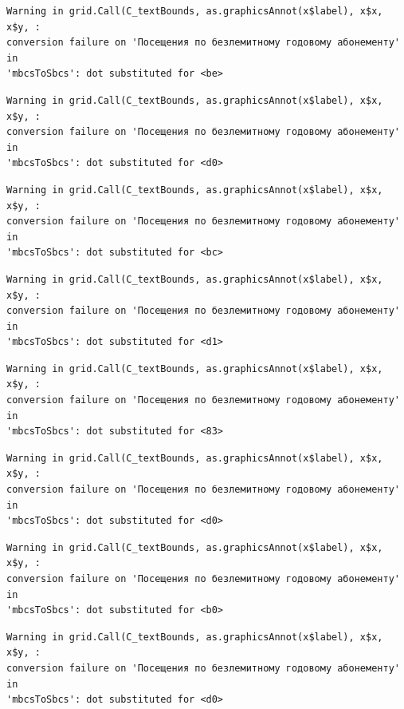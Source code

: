\documentclass[
  letterpaper,
  DIV=11,
  numbers=noendperiod]{scrartcl}
\begin{document}
\begin{verbatim}
Warning in grid.Call(C_textBounds, as.graphicsAnnot(x$label), x$x, x$y, :
conversion failure on 'Посещения по безлемитному годовому абонементу' in
'mbcsToSbcs': dot substituted for <be>
\end{verbatim}

\begin{verbatim}
Warning in grid.Call(C_textBounds, as.graphicsAnnot(x$label), x$x, x$y, :
conversion failure on 'Посещения по безлемитному годовому абонементу' in
'mbcsToSbcs': dot substituted for <d0>
\end{verbatim}

\begin{verbatim}
Warning in grid.Call(C_textBounds, as.graphicsAnnot(x$label), x$x, x$y, :
conversion failure on 'Посещения по безлемитному годовому абонементу' in
'mbcsToSbcs': dot substituted for <bc>
\end{verbatim}

\begin{verbatim}
Warning in grid.Call(C_textBounds, as.graphicsAnnot(x$label), x$x, x$y, :
conversion failure on 'Посещения по безлемитному годовому абонементу' in
'mbcsToSbcs': dot substituted for <d1>
\end{verbatim}

\begin{verbatim}
Warning in grid.Call(C_textBounds, as.graphicsAnnot(x$label), x$x, x$y, :
conversion failure on 'Посещения по безлемитному годовому абонементу' in
'mbcsToSbcs': dot substituted for <83>
\end{verbatim}

\begin{verbatim}
Warning in grid.Call(C_textBounds, as.graphicsAnnot(x$label), x$x, x$y, :
conversion failure on 'Посещения по безлемитному годовому абонементу' in
'mbcsToSbcs': dot substituted for <d0>
\end{verbatim}

\begin{verbatim}
Warning in grid.Call(C_textBounds, as.graphicsAnnot(x$label), x$x, x$y, :
conversion failure on 'Посещения по безлемитному годовому абонементу' in
'mbcsToSbcs': dot substituted for <b0>
\end{verbatim}

\begin{verbatim}
Warning in grid.Call(C_textBounds, as.graphicsAnnot(x$label), x$x, x$y, :
conversion failure on 'Посещения по безлемитному годовому абонементу' in
'mbcsToSbcs': dot substituted for <d0>
\end{verbatim}
\end{document}
